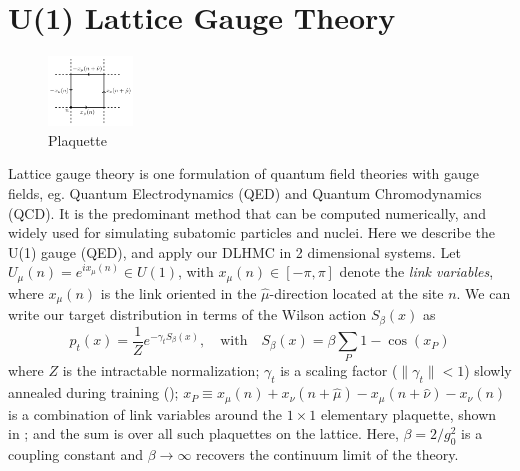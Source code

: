 \documentclass{article} %
\begin{document}
\section{\label{sec:lattice_gauge_theory}U(1) Lattice Gauge Theory}
%
\begin{figure}
      \centering
      \includegraphics[width=0.2\textwidth]{figures/plaq_tikz.pdf}
      \caption{\label{fig:plaquette}Plaquette}%
\end{figure}
Lattice gauge theory is one formulation of quantum field theories with gauge fields, eg. Quantum Electrodynamics (QED) and Quantum Chromodynamics (QCD).
It is the predominant method that can be computed numerically, and widely used for simulating subatomic particles and nuclei.
Here we describe the U(1) gauge (QED), and apply our DLHMC in 2 dimensional systems.
Let \(U_{\mu}(n) = e^{i x_{\mu}(n)} \in U(1)\), with \(x_{\mu}(n) \in [-\pi,\pi]\) denote the \emph{link
variables}, where \(x_{\mu}(n)\) is the link oriented in the \(\hat{\mu}\)-direction located at the site
\(n\).
%
We can write our target distribution in terms of the Wilson action \(S_{\beta}(x)\) as
%
\begin{equation}
   p_{t}(x) = \frac{1}{Z}e^{-\gamma_{t} S_{\beta}(x)},\quad\text{with}\quad S_{\beta}(x) = \beta \sum_{P}1 - \cos(x_{P})
   \label{eq:wilsonaction}
\end{equation}
%
where $Z$ is the intractable normalization;
\(\gamma_{t}\) is a scaling factor (\(\|\gamma_{t}\|<1\)) slowly annealed during training ();
\(x_{P} \equiv x_{\mu}(n) + x_{\nu}(n+\hat{\mu}) - x_{\mu}(n+\hat{\nu}) -x_{\nu}(n)\) is a combination of link
variables around the \(1\times1\) elementary plaquette, shown in ; and the sum is over all
such plaquettes on the lattice.
%
Here, \(\beta = 2 / g_{0}^{2}\) is a coupling constant and \(\beta\rightarrow\infty\) recovers the continuum limit of the theory. 
%
\end{document}
